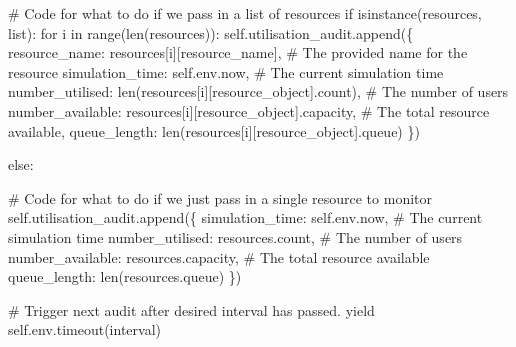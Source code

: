 \documentclass[
  letterpaper,
  DIV=11,
  numbers=noendperiod]{scrreprt}
\newenvironment{Shaded}{}{}
\newcommand{\BuiltInTok}[1]{\textcolor[rgb]{0.84,0.23,0.29}{#1}}
\newcommand{\CommentTok}[1]{\textcolor[rgb]{0.42,0.45,0.49}{#1}}
\newcommand{\ControlFlowTok}[1]{\textcolor[rgb]{0.84,0.23,0.29}{#1}}
\newcommand{\KeywordTok}[1]{\textcolor[rgb]{0.84,0.23,0.29}{#1}}
\newcommand{\NormalTok}[1]{\textcolor[rgb]{0.14,0.16,0.18}{#1}}
\newcommand{\StringTok}[1]{\textcolor[rgb]{0.01,0.18,0.38}{#1}}
\newcommand{\VariableTok}[1]{\textcolor[rgb]{0.89,0.38,0.04}{#1}}
\begin{document}
\begin{Shaded}
\begin{Highlighting}[]
        \CommentTok{\# Code for what to do if we pass in a list of resources}
        \ControlFlowTok{if} \BuiltInTok{isinstance}\NormalTok{(resources, }\BuiltInTok{list}\NormalTok{):}
            \ControlFlowTok{for}\NormalTok{ i }\KeywordTok{in} \BuiltInTok{range}\NormalTok{(}\BuiltInTok{len}\NormalTok{(resources)):}
                \VariableTok{self}\NormalTok{.utilisation\_audit.append(\{}
                    \StringTok{\textquotesingle{}resource\_name\textquotesingle{}}\NormalTok{: resources[i][}\StringTok{\textquotesingle{}resource\_name\textquotesingle{}}\NormalTok{], }\CommentTok{\# The provided name for the resource}
                    \StringTok{\textquotesingle{}simulation\_time\textquotesingle{}}\NormalTok{: }\VariableTok{self}\NormalTok{.env.now,  }\CommentTok{\# The current simulation time}
                    \StringTok{\textquotesingle{}number\_utilised\textquotesingle{}}\NormalTok{: }\BuiltInTok{len}\NormalTok{(resources[i][}\StringTok{\textquotesingle{}resource\_object\textquotesingle{}}\NormalTok{].count), }\CommentTok{\# The number of users}
                    \StringTok{\textquotesingle{}number\_available\textquotesingle{}}\NormalTok{: resources[i][}\StringTok{\textquotesingle{}resource\_object\textquotesingle{}}\NormalTok{].capacity, }\CommentTok{\# The total resource available,}
                    \StringTok{\textquotesingle{}queue\_length\textquotesingle{}}\NormalTok{: }\BuiltInTok{len}\NormalTok{(resources[i][}\StringTok{\textquotesingle{}resource\_object\textquotesingle{}}\NormalTok{].queue)}
\NormalTok{                \})}

        \ControlFlowTok{else}\NormalTok{:}

            \CommentTok{\# Code for what to do if we just pass in a single resource to monitor}
            \VariableTok{self}\NormalTok{.utilisation\_audit.append(\{}
                \StringTok{\textquotesingle{}simulation\_time\textquotesingle{}}\NormalTok{: }\VariableTok{self}\NormalTok{.env.now,  }\CommentTok{\# The current simulation time}
                \StringTok{\textquotesingle{}number\_utilised\textquotesingle{}}\NormalTok{: resources.count,  }\CommentTok{\# The number of users}
                \StringTok{\textquotesingle{}number\_available\textquotesingle{}}\NormalTok{: resources.capacity, }\CommentTok{\# The total resource available}
                \StringTok{\textquotesingle{}queue\_length\textquotesingle{}}\NormalTok{: }\BuiltInTok{len}\NormalTok{(resources.queue)}
\NormalTok{            \})}


        \CommentTok{\# Trigger next audit after desired interval has passed.}
        \ControlFlowTok{yield} \VariableTok{self}\NormalTok{.env.timeout(interval)}
\end{Highlighting}
\end{Shaded}
\end{document}

